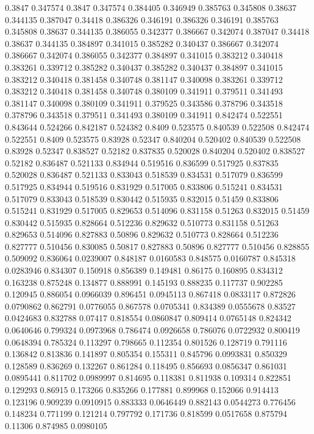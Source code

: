 0.3847 0.347574
0.3847 0.347574
0.384405 0.346949
0.385763 0.345808
0.38637 0.344135
0.387047 0.34418
0.386326 0.346191
0.386326 0.346191
0.385763 0.345808
0.38637 0.344135
0.386055 0.342377
0.386667 0.342074
0.387047 0.34418
0.38637 0.344135
0.384897 0.341015
0.385282 0.340437
0.386667 0.342074
0.386667 0.342074
0.386055 0.342377
0.384897 0.341015
0.383212 0.340418
0.383261 0.339712
0.385282 0.340437
0.385282 0.340437
0.384897 0.341015
0.383212 0.340418
0.381458 0.340748
0.381147 0.340098
0.383261 0.339712
0.383212 0.340418
0.381458 0.340748
0.380109 0.341911
0.379511 0.341493
0.381147 0.340098
0.380109 0.341911
0.379525 0.343586
0.378796 0.343518
0.378796 0.343518
0.379511 0.341493
0.380109 0.341911
0.842474 0.522551
0.843644 0.524266
0.842187 0.524382
0.8409 0.523575
0.840539 0.522508
0.842474 0.522551
0.8409 0.523575
0.83928 0.52347
0.840204 0.520402
0.840539 0.522508
0.83928 0.52347
0.838527 0.52182
0.837835 0.520028
0.840204 0.520402
0.838527 0.52182
0.836487 0.521133
0.834944 0.519516
0.836599 0.517925
0.837835 0.520028
0.836487 0.521133
0.833043 0.518539
0.834531 0.517079
0.836599 0.517925
0.834944 0.519516
0.831929 0.517005
0.833806 0.515241
0.834531 0.517079
0.833043 0.518539
0.830442 0.515935
0.832015 0.51459
0.833806 0.515241
0.831929 0.517005
0.829653 0.514096
0.831158 0.51263
0.832015 0.51459
0.830442 0.515935
0.828664 0.512236
0.829632 0.510773
0.831158 0.51263
0.829653 0.514096
0.827883 0.50896
0.829632 0.510773
0.828664 0.512236
0.827777 0.510456
0.830085 0.50817
0.827883 0.50896
0.827777 0.510456
0.828855 0.509092
0.836064 0.0239007
0.848187 0.0160583
0.848575 0.0160787
0.845318 0.0283946
0.834307 0.150918
0.856389 0.149481
0.86175 0.160895
0.834312 0.163238
0.875248 0.134877
0.888991 0.145193
0.888235 0.117737
0.902285 0.120945
0.886054 0.0966039
0.896451 0.0945113
0.867418 0.0833117
0.872826 0.0790862
0.862791 0.0776055
0.867578 0.0705341
0.834389 0.0555678
0.83527 0.0424683
0.832788 0.07417
0.818554 0.0860847
0.809414 0.0765148
0.824342 0.0640646
0.799324 0.0973968
0.786474 0.0926658
0.786076 0.0722932
0.800419 0.0648394
0.785324 0.113297
0.798665 0.112354
0.801526 0.128719
0.791116 0.136842
0.813836 0.141897
0.805354 0.155311
0.845796 0.0993831
0.850329 0.128589
0.836269 0.132267
0.861284 0.118495
0.856693 0.0856347
0.861031 0.0895441
0.811702 0.0989997
0.814695 0.118381
0.811938 0.109314
0.822851 0.129293
0.86915 0.173266
0.835266 0.177881
0.899968 0.152066
0.914413 0.123196
0.909239 0.0910915
0.883333 0.0646449
0.882143 0.0544273
0.776456 0.148234
0.771199 0.121214
0.797792 0.171736
0.818599 0.0517658
0.875794 0.11306
0.874985 0.0980105
